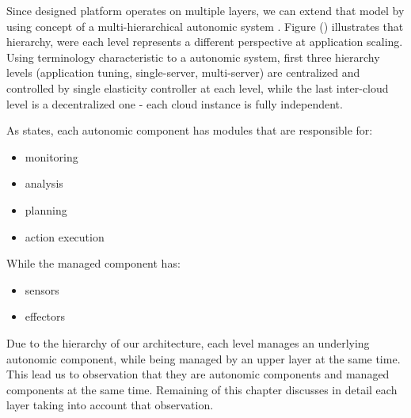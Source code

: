 Since designed platform operates on multiple layers, we can extend that model by using concept of a multi-hierarchical autonomic system \cite{LiWoZh05}. Figure () illustrates that hierarchy, were each level represents a different perspective at application scaling. Using terminology characteristic to a autonomic system, first three hierarchy levels (application tuning, single-server, multi-server) are centralized and controlled by single elasticity controller at each level, while the last inter-cloud level is a decentralized one - each cloud instance is fully independent.

As \cite{IBM06} states, each autonomic component has modules that are responsible for:
\begin{itemize}
	\item monitoring
	\item analysis
	\item planning
	\item action execution
\end{itemize}

While the managed component has:
\begin{itemize}
	\item sensors
	\item effectors
\end{itemize}

Due to the hierarchy of our architecture, each level manages an underlying autonomic component, while being managed by an upper layer at the same time. This lead us to observation that they are autonomic components and managed components at the same time. Remaining of this chapter discusses in detail each layer taking into account that observation.

